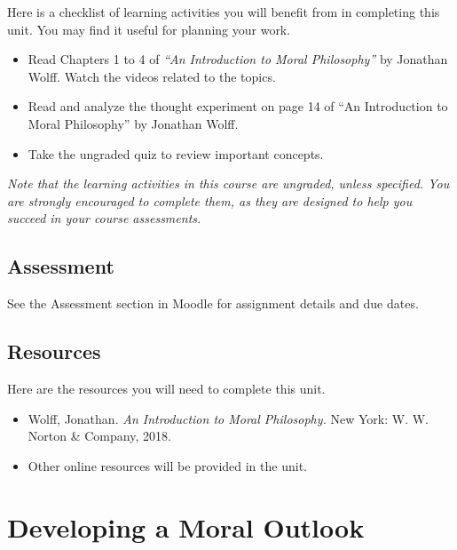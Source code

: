 \documentclass[
]{book}
\providecommand{\tightlist}{%
  \setlength{\itemsep}{0pt}\setlength{\parskip}{0pt}}
\begin{document}
Here is a checklist of learning activities you will benefit from in completing this unit. You may find it useful for planning your work.

\begin{itemize}
\tightlist
\item
  Read Chapters 1 to 4 of \emph{``An Introduction to Moral Philosophy''} by Jonathan Wolff. Watch the videos related to the topics.
\item
  Read and analyze the thought experiment on page 14 of ``An Introduction to Moral Philosophy'' by Jonathan Wolff.
\item
  Take the ungraded quiz to review important concepts.
\end{itemize}

\emph{Note that the learning activities in this course are ungraded, unless specified. You are strongly encouraged to complete them, as they are designed to help you succeed in your course assessments.}

\hypertarget{assessment}{%
\subsection*{Assessment}\label{assessment}}

See the Assessment section in Moodle for assignment details and due dates.

\hypertarget{resources}{%
\subsection*{Resources}\label{resources}}

Here are the resources you will need to complete this unit.

\begin{itemize}
\tightlist
\item
  Wolff, Jonathan. \emph{An Introduction to Moral Philosophy.} New York: W. W. Norton \& Company, 2018.\\
\item
  Other online resources will be provided in the unit.
\end{itemize}

\hypertarget{developing-a-moral-outlook}{%
\section{Developing a Moral Outlook}\label{developing-a-moral-outlook}}
\end{document}
